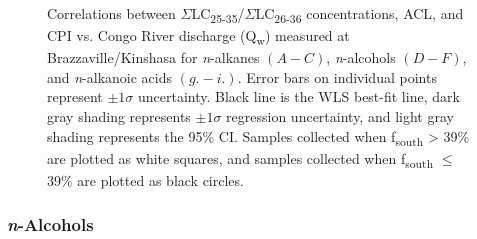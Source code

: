 \begin{figure}[p]
	\caption[Correlations between ACL, CPI, and discharge]{Correlations between $\Sigma$LC\textsubscript{25-35}/$\Sigma$LC\textsubscript{26-36} concentrations, ACL, and CPI vs. Congo River discharge (Q\textsubscript{w}) measured at Brazzaville/Kinshasa for \textit{n}-alkanes $(A - C)$, \textit{n}-alcohols $(D - F)$, and \textit{n}-alkanoic acids $(g. - i.)$. Error bars on individual points represent $\pm 1 \sigma$ uncertainty. Black line is the WLS best-fit line, dark gray shading represents $\pm 1 \sigma$  regression uncertainty, and light gray shading represents the 95\% CI. Samples collected when f\textsubscript{south} > 39\% are plotted as white squares, and samples collected when f\textsubscript{south} $\leq$ 39\% are plotted as black circles.}
	\label{Ch4Fig:5} 
\end{figure}

\subsubsection{\textit{n}-Alcohols}

